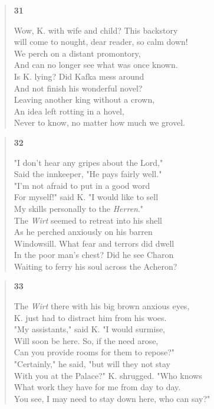 \documentclass{article}
\begin{document}
\begin{verse}
  \begin{center}
    \textbf{31} \\
  \end{center}
  Wow, K. with wife and child? This backstory \\
  will come to nought, dear reader, so calm down! \\
  We perch on a distant promontory, \\
  And can no longer see what was once known. \\
  Is K. lying? Did Kafka mess around \\
  And not finish his wonderful novel? \\
  Leaving another king without a crown, \\
  An idea left rotting in a hovel, \\
  Never to know, no matter how much we grovel.
\end{verse}

\newpage
\begin{verse}
  \begin{center}
    \textbf{32} \\
  \end{center}
  "I don't hear any gripes about the Lord," \\
  Said the innkeeper, "He pays fairly well." \\
  "I'm not afraid to put in a good word \\
  For myself!" said K. "I would like to sell \\
  My skills personally to the \textit{Herren}." \\
  The \textit{Wirt} seemed to retreat into his shell \\
  As he perched anxiously on his barren \\
  Windowsill. What fear and terrors did dwell \\
  In the poor man's chest? Did he see Charon \\
  Waiting to ferry his soul across the Acheron?
\end{verse}

\begin{verse}
  \begin{center}
    \textbf{33} \\
  \end{center}
  The \textit{Wirt} there with his big brown anxious eyes, \\
  K. just had to distract him from his woes. \\
  "My assistants," said K. "I would surmise, \\
  Will soon be here. So, if the need arose, \\
  Can you provide rooms for them to repose?" \\
  "Certainly," he said, "but will they not stay \\
  With you at the Palace?" K. shrugged. "Who knows \\
  What work they have for me from day to day. \\
  You see, I may need to stay down here, who can say?"
\end{verse}
\end{document}
